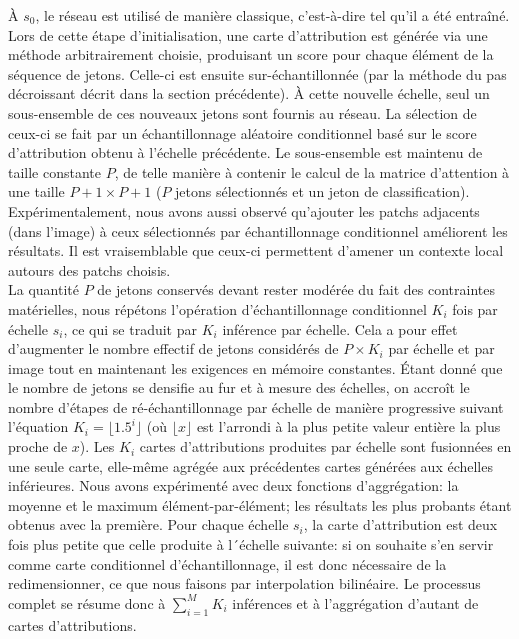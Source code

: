 À $s_0$, le réseau est utilisé de manière classique, c'est-à-dire tel qu'il a été entraîné. Lors de cette étape d'initialisation, une carte d'attribution est générée via une méthode arbitrairement choisie, produisant un score pour chaque élément de la séquence de jetons. Celle-ci est ensuite sur-échantillonnée (par la méthode du pas décroissant décrit dans la section précédente). À cette nouvelle échelle, seul un sous-ensemble de ces nouveaux jetons sont fournis au réseau. La sélection de ceux-ci se fait par un échantillonnage aléatoire conditionnel basé sur le score d'attribution obtenu à l'échelle précédente. Le sous-ensemble est maintenu de taille constante $P$, de telle manière à contenir le calcul de la matrice d'attention à une taille $P+1 \times P+1$ ($P$ jetons sélectionnés et un jeton de classification). Expérimentalement, nous avons aussi observé qu'ajouter les patchs adjacents (dans l'image) à ceux sélectionnés par échantillonnage conditionnel améliorent les résultats. Il est vraisemblable que ceux-ci permettent d'amener un contexte local autours des patchs choisis. \\
La quantité $P$ de jetons conservés devant rester modérée du fait des contraintes matérielles, nous répétons l'opération d'échantillonnage conditionnel $K_i$ fois par échelle $s_i$, ce qui se traduit par $K_i$ inférence par échelle. Cela a pour effet d'augmenter le nombre effectif de jetons considérés de $P \times K_i$ par échelle et par image tout en maintenant les exigences en mémoire constantes. Étant donné que le nombre de jetons se densifie au fur et à mesure des échelles, on accroît le nombre d'étapes de ré-échantillonnage par échelle de manière progressive suivant l'équation $K_i = \lfloor 1.5^i \rfloor$ (où $\lfloor x \rfloor$ est l'arrondi à la plus petite valeur entière la plus proche de $x$).
Les $K_i$ cartes d'attributions produites par échelle sont fusionnées en une seule carte, elle-même agrégée aux précédentes cartes générées aux échelles inférieures. Nous avons expérimenté avec deux fonctions d'aggrégation: la moyenne et le maximum élément-par-élément; les résultats les plus probants étant obtenus avec la première. Pour chaque échelle $s_i$, la carte d'attribution est deux fois plus petite que celle produite à l´échelle suivante: si on souhaite s'en servir comme carte conditionnel d'échantillonnage, il est donc nécessaire de la redimensionner, ce que nous faisons par interpolation bilinéaire. Le processus complet se résume donc à $\sum_{i=1}^{M} K_i$ inférences et à l'aggrégation d'autant de cartes d'attributions. \\
